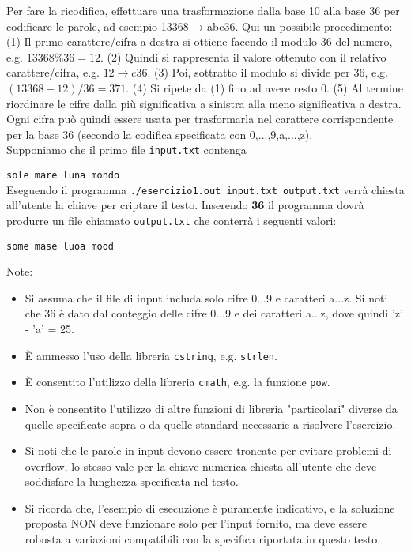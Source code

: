 \documentclass{article}
\begin{document}
    Per fare la ricodifica, effettuare una trasformazione dalla base 10 alla base 36 per codificare le parole, ad esempio 13368 → abc36. Qui un possibile procedimento: (1) Il primo carattere/cifra a destra si ottiene facendo il modulo 36 del numero, e.g. \(13368 \% 36 = 12\). (2) Quindi si rappresenta il valore ottenuto con il relativo carattere/cifra, e.g. \(12 \rightarrow c36\). (3) Poi, sottratto il modulo si divide per 36, e.g. \((13368 - 12)/36 = 371\). (4) Si ripete da (1) fino ad avere resto 0. (5) Al termine riordinare le cifre dalla più significativa a sinistra alla meno significativa a destra. Ogni cifra può quindi essere usata per trasformarla nel carattere corrispondente per la base 36 (secondo la codifica specificata con 0,...,9,a,...,z).\\

    \noindent Supponiamo che il primo file \texttt{input.txt} contenga 
    
    \texttt{sole mare luna mondo}\\
    
    \noindent Eseguendo il programma \texttt{./esercizio1.out input.txt output.txt} verrà chiesta all'utente la chiave per criptare il testo. Inserendo \textbf{36} il programma dovrà produrre un file chiamato \texttt{output.txt} che conterrà i seguenti valori: 
    
    \texttt{some mase luoa mood}

    Note:
    \begin{itemize}
        \item Si assuma che il file di input includa solo cifre 0...9 e caratteri a...z. Si noti che 36 è dato dal conteggio delle cifre 0...9 e dei caratteri a...z, dove quindi 'z' - 'a' = 25.
        \item È ammesso l'uso della libreria \texttt{cstring}, e.g. \texttt{strlen}.
        \item È consentito l'utilizzo della libreria \texttt{cmath}, e.g. la funzione \texttt{pow}.
        \item Non è consentito l'utilizzo di altre funzioni di libreria "particolari" diverse da quelle specificate sopra o da quelle standard necessarie a risolvere l'esercizio.
        \item Si noti che le parole in input devono essere troncate per evitare problemi di overflow, lo stesso vale per la chiave numerica chiesta all'utente che deve soddisfare la lunghezza specificata nel testo.
        \item Si ricorda che, l'esempio di esecuzione è puramente indicativo, e la soluzione proposta NON deve funzionare solo per l'input fornito, ma deve essere robusta a variazioni compatibili con la specifica riportata in questo testo.
    \end{itemize}
\end{document}
